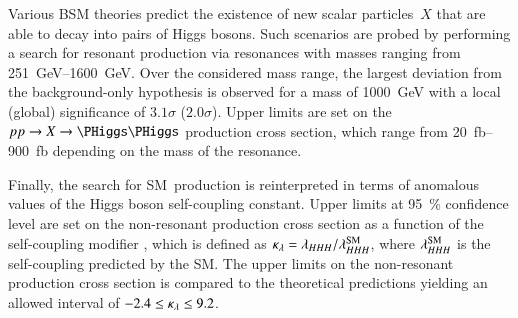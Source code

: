 Various BSM theories predict the existence of new scalar particles~$X$ that are
able to decay into pairs of Higgs bosons. Such scenarios are probed by
performing a search for resonant \HH production via %
resonances with masses ranging from \SIrange{251}{1600}{\GeV}. Over the
considered mass range, the largest deviation from the background-only hypothesis
is observed for a mass of \SI{1000}{\GeV} with a local (global) significance of
$3.1\sigma$ ($2.0\sigma$). Upper limits are set on the $\pp \to X \to \HH$
production cross section, which range from \SIrange{20}{900}{\femto\barn}
depending on the mass of the resonance.

Finally, the search for SM~\HH production is reinterpreted in terms of anomalous
values of the Higgs boson self-coupling constant. Upper limits at
\SI{95}{\percent} confidence level are set on the non-resonant \HH production
cross section as a function of the self-coupling modifier \klambda, which is
defined as $\kappa_{\lambda} = \lambda_{HHH} / \lambda_{HHH}^{\text{SM}}$, where
$\lambda_{HHH}^{\text{SM}}$ is the self-coupling predicted by the SM. The upper
limits on the non-resonant \HH production cross section is compared to the
theoretical predictions yielding an allowed \klambda interval of
$\num{-2.4} \leq \kappa_{\lambda} \leq 9.2$.

%


